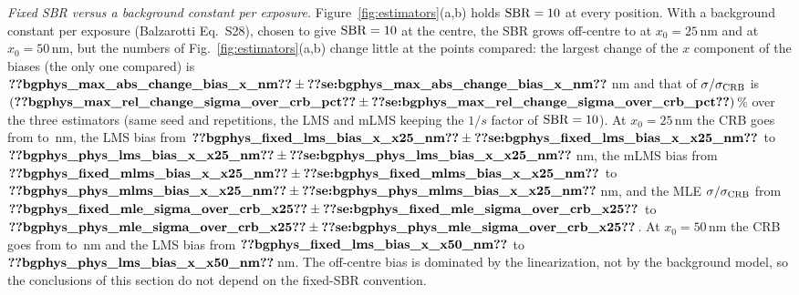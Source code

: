 \emph{Fixed SBR versus a background constant per exposure.} Figure~\ref{fig:estimators}(a,b)
holds $\mathrm{SBR}=10$ at every position. With a background constant per exposure (Balzarotti
Eq.~S28), chosen to give $\mathrm{SBR}=10$ at the centre, the SBR grows off-centre to
 at $x_0=25$\,nm and
 at $x_0=50$\,nm, but the numbers of
Fig.~\ref{fig:estimators}(a,b) change little at the points compared: the largest change of the
$x$ component of the biases (the only one compared) is
$\pnum{bgphys_max_abs_change_bias_x_nm}\pm\pnumse{bgphys_max_abs_change_bias_x_nm}$\,nm and that of
$\sigma/\sigma_{\mathrm{CRB}}$ is
$(\pnum{bgphys_max_rel_change_sigma_over_crb_pct}\pm\pnumse{bgphys_max_rel_change_sigma_over_crb_pct})$\%
over the three estimators%
%
%
%
%
%
%
%
%
%
%
%
%
%
%
%
 (same seed and repetitions, the LMS and mLMS keeping
the $1/s$ factor of $\mathrm{SBR}=10$). At $x_0=25$\,nm the CRB goes from
 to
\,nm, the LMS bias from
$\pnum{bgphys_fixed_lms_bias_x_x25_nm}\pm\pnumse{bgphys_fixed_lms_bias_x_x25_nm}$
to $\pnum{bgphys_phys_lms_bias_x_x25_nm}\pm\pnumse{bgphys_phys_lms_bias_x_x25_nm}$\,nm,
the mLMS bias from
$\pnum{bgphys_fixed_mlms_bias_x_x25_nm}\pm\pnumse{bgphys_fixed_mlms_bias_x_x25_nm}$
to $\pnum{bgphys_phys_mlms_bias_x_x25_nm}\pm\pnumse{bgphys_phys_mlms_bias_x_x25_nm}$\,nm,
and the MLE $\sigma/\sigma_{\mathrm{CRB}}$ from
$\pnum{bgphys_fixed_mle_sigma_over_crb_x25}\pm\pnumse{bgphys_fixed_mle_sigma_over_crb_x25}$
to $\pnum{bgphys_phys_mle_sigma_over_crb_x25}\pm\pnumse{bgphys_phys_mle_sigma_over_crb_x25}$.
At $x_0=50$\,nm the CRB goes from  to
\,nm and the LMS bias from
$\pnum{bgphys_fixed_lms_bias_x_x50_nm}$ to
$\pnum{bgphys_phys_lms_bias_x_x50_nm}$\,nm. The off-centre
bias is dominated by the linearization, not by the background model, so the conclusions of this
section do not depend on the fixed-SBR convention.

